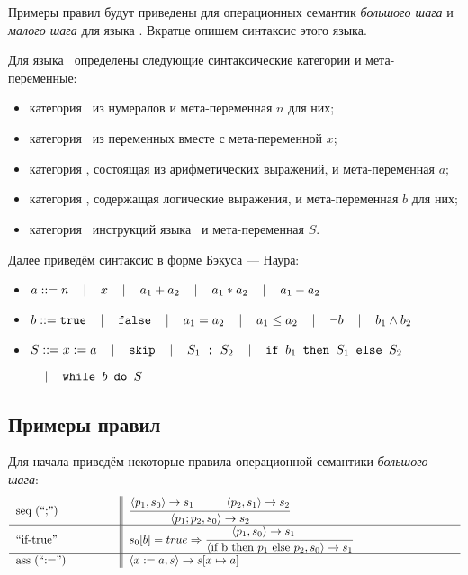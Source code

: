 \documentclass[aps,12pt,final,oneside,onecolumn,musixtex,superscriptaddress,centertags]{article}
\newcommand{\ccode}[1]{\mbox{\texttt{#1}}}
\begin{document}
    Примеры правил будут приведены для операционных семантик \emph{большого шага} и \emph{малого шага} для языка \While\cite{Nielson:1992:SAF:129085}. Вкратце опишем синтаксис этого языка.

    Для языка \While \ccode{ }определены следующие синтаксические категории и мета-переменные:
    \begin{itemize}
       \item категория \Num \ccode{ }из нумералов и мета-переменная $n$ для них;
       \item категория \Var \ccode{ }из переменных вместе с мета-переменной $x$;
       \item категория \Aexp, состоящая из арифметических выражений, и мета-переменная $a$;
       \item категория \Bexp, содержащая логические выражения, и мета-переменная $b$ для них;
       \item категория \Stm \ccode{ }инструкций языка \While \ccode{ }и мета-переменная $S$.
    \end{itemize}
    
    \vspace{4mm}
    Далее приведём синтаксис в форме Бэкуса --- Наура:

    \newcommand{\sep}[0]{\hspace{4mm} | \hspace{4mm}}
    \begin{itemize}
    \item[] $a ::= n            \sep x             \sep a_1 + a_2 \sep a_1 * a_2    \sep a_1 - a_2                     $
    \item[] $b ::= \ccode{true} \sep \ccode{false} \sep a_1 = a_2 \sep a_1 \leq a_2 \sep \neg b    \sep b_1 \wedge b_2 $
    \item[] $S ::= x := a       \sep \ccode{skip}  \sep S_1 \ccode{ ; } S_2
                                \sep \ccode{if } b_1 \ccode{ then } S_1 \ccode{ else } S_2$
    
                 \hspace{8cm} $ \sep \ccode{while } b \ccode{ do } S $
    \end{itemize}

  \newpage
  \subsection{Примеры правил}

    Для начала приведём некоторые правила операционной семантики \emph{большого шага}:
    \begin{align*}
       \begin{tabular}{ p{3cm} || p{10cm} }
          seq (``;'')  & $\seqns$    \\
          \hline
          ``if-true''  & $\iftruens$ \\
          \hline
          ass (``:='') & $\assignns$ \\
       \end{tabular}
    \end{align*}
\end{document}
